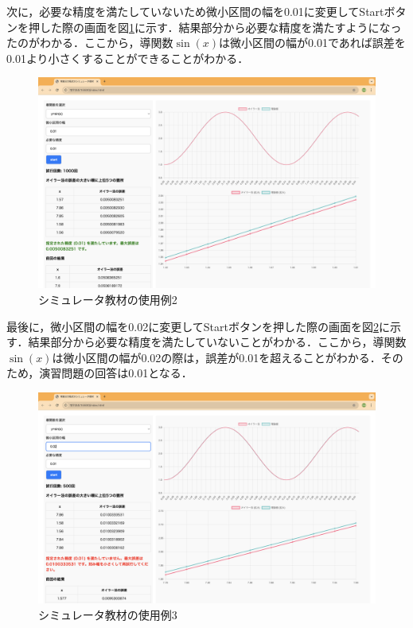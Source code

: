 \documentclass[a4paper, 12pt]{ltjsarticle}
\begin{document}
\clearpage

次に，必要な精度を満たしていないため微小区間の幅を0.01に変更してStartボタンを押した際の画面を図\ref{fig:シミュレータ教材の使用例2}に示す．結果部分から必要な精度を満たすようになったのがわかる．ここから，導関数$\sin(x)$は微小区間の幅が0.01であれば誤差を0.01より小さくすることができることがわかる．

\begin{figure}[h]
\begin{center}
\includegraphics[clip,width=\textwidth,keepaspectratio]{sim-sample3.png}
\end{center}
\caption{シミュレータ教材の使用例2}
\label{fig:シミュレータ教材の使用例2}
\end{figure}

\clearpage

最後に，微小区間の幅を0.02に変更してStartボタンを押した際の画面を図\ref{fig:シミュレータ教材の使用例3}に示す．結果部分から必要な精度を満たしていないことがわかる．ここから，導関数$\sin(x)$は微小区間の幅が0.02の際は，誤差が0.01を超えることがわかる．そのため，演習問題の回答は0.01となる．

\begin{figure}[h]
\begin{center}
\includegraphics[clip,width=\textwidth,keepaspectratio]{sim-sample4.png}
\end{center}
\caption{シミュレータ教材の使用例3}
\label{fig:シミュレータ教材の使用例3}
\end{figure}
\end{document}
